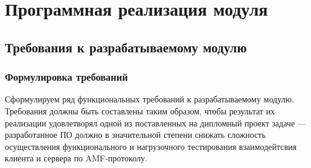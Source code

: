 \chapter{Программная реализация модуля}

\section{Требования к разрабатываемому модулю}

\subsection{Формулировка требований}
Сформулируем ряд функциональных требований к разрабатываемому модулю. Требования должны быть составлены
таким образом, чтобы результат их реализации удовлетворял одной из поставленных на дипломный проект задаче ---
разработанное ПО должно в значительной степени снижать сложность осуществления функционального
и нагрузочного тестирования взаимодейтсвия клиента и сервера по AMF-протоколу.

